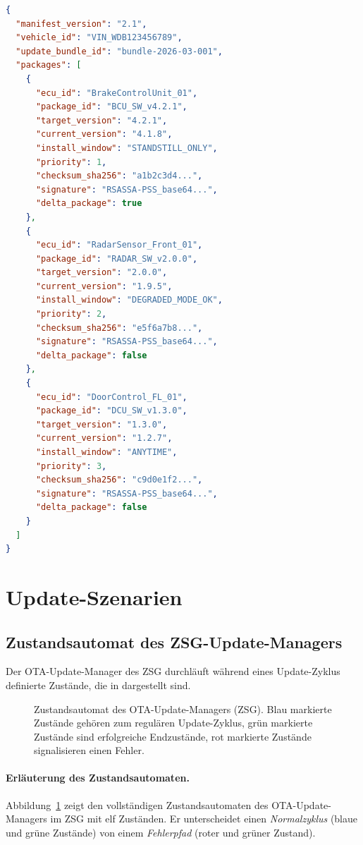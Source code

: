 ﻿\documentclass[12pt,a4paper,twoside]{article}
\begin{document}
\begin{lstlisting}[language=json,caption={Software Update Manifest (SUM) -- vereinfachtes Beispiel},label={lst:manifest}]
{
  "manifest_version": "2.1",
  "vehicle_id": "VIN_WDB123456789",
  "update_bundle_id": "bundle-2026-03-001",
  "packages": [
    {
      "ecu_id": "BrakeControlUnit_01",
      "package_id": "BCU_SW_v4.2.1",
      "target_version": "4.2.1",
      "current_version": "4.1.8",
      "install_window": "STANDSTILL_ONLY",
      "priority": 1,
      "checksum_sha256": "a1b2c3d4...",
      "signature": "RSASSA-PSS_base64...",
      "delta_package": true
    },
    {
      "ecu_id": "RadarSensor_Front_01",
      "package_id": "RADAR_SW_v2.0.0",
      "target_version": "2.0.0",
      "current_version": "1.9.5",
      "install_window": "DEGRADED_MODE_OK",
      "priority": 2,
      "checksum_sha256": "e5f6a7b8...",
      "signature": "RSASSA-PSS_base64...",
      "delta_package": false
    },
    {
      "ecu_id": "DoorControl_FL_01",
      "package_id": "DCU_SW_v1.3.0",
      "target_version": "1.3.0",
      "current_version": "1.2.7",
      "install_window": "ANYTIME",
      "priority": 3,
      "checksum_sha256": "c9d0e1f2...",
      "signature": "RSASSA-PSS_base64...",
      "delta_package": false
    }
  ]
}
\end{lstlisting}


\section{Update-Szenarien}
\label{sec:szenario}


\subsection{Zustandsautomat des ZSG-Update-Managers}
\label{subsec:zustandsautomat}

Der OTA-Update-Manager des ZSG durchläuft während eines Update-Zyklus
definierte Zustände, die in  dargestellt sind.

\begin{figure}[h!]
  \centering
  
  \caption{Zustandsautomat des OTA-Update-Managers (ZSG).
    Blau markierte Zustände gehören zum regulären Update-Zyklus,
    grün markierte Zustände sind erfolgreiche Endzustände,
    rot markierte Zustände signalisieren einen Fehler.}
  \label{fig:statemachine}
\end{figure}

\paragraph*{Erläuterung des Zustandsautomaten.}
Abbildung~\ref{fig:statemachine} zeigt den vollständigen Zustandsautomaten
des OTA-Update-Managers im ZSG mit elf Zuständen.
Er unterscheidet einen \emph{Normalzyklus} (blaue und grüne Zustände) von
einem \emph{Fehlerpfad} (roter und grüner Zustand).
\end{document}
